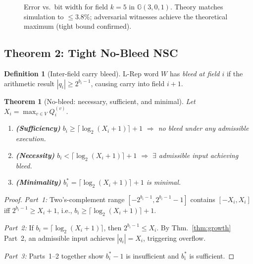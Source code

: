\documentclass[11pt,a4paper]{article}
\theoremstyle{definition}
\newtheorem{definition}{Definition}[section]
\theoremstyle{plain}
\newtheorem{theorem}{Theorem}[section]
\theoremstyle{remark}
\newcommand{\GA}{\mathbb{G}}
\begin{document}
\begin{figure}[h]
\centering
{}
\caption{Error vs.\ bit width for field $k=5$ in $\GA(3,0,1)$.
Theory matches simulation to $\le 3.8\%$; adversarial witnesses
achieve the theoretical maximum (tight bound confirmed).}
\label{fig:error}
\end{figure}

\subsection{Theorem 2: Tight No-Bleed NSC}
\label{sec:nobleed}

\begin{definition}[Inter-field carry bleed]
L-Rep word $W$ has \emph{bleed at field $i$} if the arithmetic result
$|q_i|\ge 2^{b_i-1}$, causing carry into field $i+1$.
\end{definition}

\begin{theorem}[No-bleed: necessary, sufficient, and minimal]
\label{thm:nobleed}
Let $X_i = \max_{v\in V}Q_i^{(v)}$.
\begin{enumerate}
  \item \textbf{(Sufficiency)} $b_i\ge\lceil\log_2(X_i+1)\rceil+1$ $\Rightarrow$
        no bleed under any admissible execution.
  \item \textbf{(Necessity)} $b_i < \lceil\log_2(X_i+1)\rceil+1$ $\Rightarrow$
        $\exists$ admissible input achieving bleed.
  \item \textbf{(Minimality)} $b_i^* = \lceil\log_2(X_i+1)\rceil+1$ is minimal.
\end{enumerate}
\end{theorem}
\begin{proof}
\textit{Part~1:}
Two's-complement range $[-2^{b_i-1},2^{b_i-1}-1]$ contains $[-X_i,X_i]$
iff $2^{b_i-1}\ge X_i+1$, i.e., $b_i\ge\lceil\log_2(X_i+1)\rceil+1$.

\textit{Part~2:}
If $b_i=\lceil\log_2(X_i+1)\rceil$, then $2^{b_i-1}\le X_i$.
By Thm.~\ref{thm:growth} Part~2, an admissible input achieves $|q_i|=X_i$,
triggering overflow.

\textit{Part~3:} Parts~1--2 together show $b_i^*-1$ is insufficient and $b_i^*$ is sufficient.
\end{proof}
\end{document}
